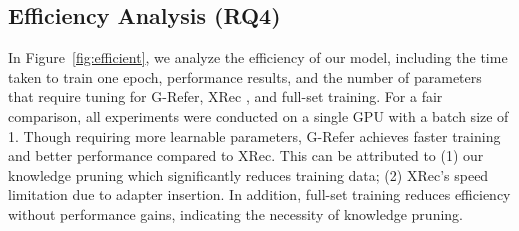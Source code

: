 

% 

\subsection{Efficiency Analysis (RQ4)}

In Figure~\ref{fig:efficient}, we analyze the efficiency of our model, including the time taken to train one epoch, performance results, and the number of parameters that require tuning for G-Refer, XRec \cite{ma2024xrec}, and full-set training. For a fair comparison, all experiments were conducted on a single GPU with a batch size of 1. Though requiring more learnable parameters, G-Refer achieves faster training and better performance compared to XRec. This can be attributed to (1) our knowledge pruning which significantly reduces training data; (2) XRec's speed limitation due to adapter insertion. In addition, full-set training reduces efficiency without performance gains, indicating the necessity of knowledge pruning.
